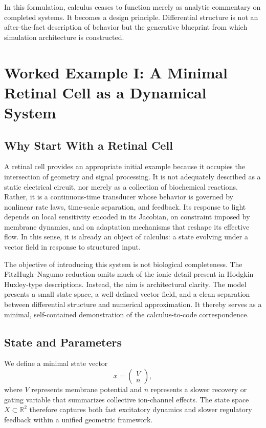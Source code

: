 \documentclass[12pt]{book}
\begin{document}
In this formulation, calculus ceases to function merely as analytic
commentary on completed systems. It becomes a design principle.
Differential structure is not an after-the-fact description of
behavior but the generative blueprint from which simulation
architecture is constructed.

\chapter{Worked Example I: A Minimal Retinal Cell as a Dynamical System}

\section{Why Start With a Retinal Cell}

A retinal cell provides an appropriate initial example because it
occupies the intersection of geometry and signal processing. It is not
adequately described as a static electrical circuit, nor merely as a
collection of biochemical reactions. Rather, it is a continuous-time
transducer whose behavior is governed by nonlinear rate laws, time-scale
separation, and feedback. Its response to light depends on local
sensitivity encoded in its Jacobian, on constraint imposed by membrane
dynamics, and on adaptation mechanisms that reshape its effective flow.
In this sense, it is already an object of calculus: a state evolving
under a vector field in response to structured input.

The objective of introducing this system is not biological completeness.
The FitzHugh--Nagumo reduction omits much of the ionic detail present in
Hodgkin--Huxley-type descriptions. Instead, the aim is architectural
clarity. The model presents a small state space, a well-defined vector
field, and a clean separation between differential structure and
numerical approximation. It thereby serves as a minimal, self-contained
demonstration of the calculus-to-code correspondence.

\section{State and Parameters}

We define a minimal state vector
\[
x =
\begin{pmatrix}
V \\
n
\end{pmatrix},
\]
where $V$ represents membrane potential and $n$ represents a slower
recovery or gating variable that summarizes collective ion-channel
effects. The state space $X \subset \mathbb{R}^2$ therefore captures
both fast excitatory dynamics and slower regulatory feedback within
a unified geometric framework.
\end{document}
